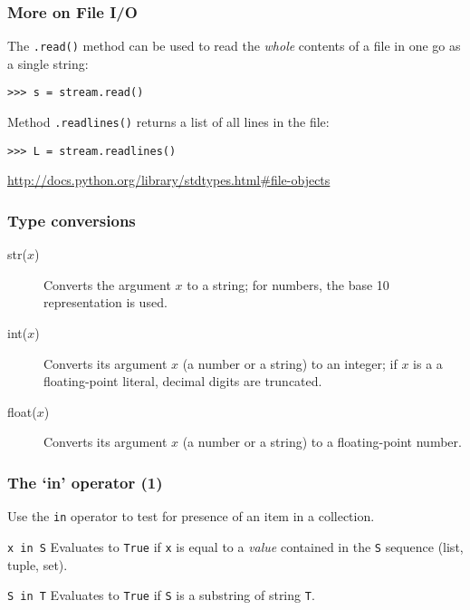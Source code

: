 \documentclass[english,serif,mathserif,xcolor=pdftex,dvipsnames,table]{beamer}
\begin{document}
\begin{frame}[fragile]
  \frametitle{More on File I/O}

  The \lstinline|.read()| method can be used to read the \emph{whole} contents
  of a file in one go as a single string:
\begin{lstlisting}
>>> s = stream.read()
\end{lstlisting}

  \+
  Method \lstinline|.readlines()| returns a list of all lines in the file:
\begin{lstlisting}
>>> L = stream.readlines()
\end{lstlisting}

  \begin{references}
    \url{http://docs.python.org/library/stdtypes.html#file-objects}
  \end{references}
\end{frame}


\begin{frame}[fragile,label=typeconv]
  \frametitle{Type conversions}
  \begin{description}
  \item[str($x$)] Converts the argument $x$ to a string; for numbers,
    the base 10 representation is used.
  \item[int($x$)] Converts its argument $x$ (a number or a string) to an integer;
    if $x$ is a a floating-point literal, decimal digits are truncated.
  \item[float($x$)] Converts its argument $x$ (a number or a string) to a
    floating-point number.
  \end{description}
\end{frame}


\begin{frame}[fragile]
  \frametitle{The `{\ttfamily\bfseries in}' operator (1)}

  Use the \lstinline|in| operator to test for presence of an item in a
  collection.

  \begin{describe}{\lstinline|x in S|}
    Evaluates to \texttt{True} if \lstinline|x| is equal to a \emph{value}
    contained in the \lstinline|S| sequence (list, tuple, set).
  \end{describe}

  \begin{describe}{\lstinline|S in T|}
    Evaluates to \texttt{True} if \lstinline|S| is a substring of
    string \lstinline|T|.
  \end{describe}

\end{frame}
\end{document}
